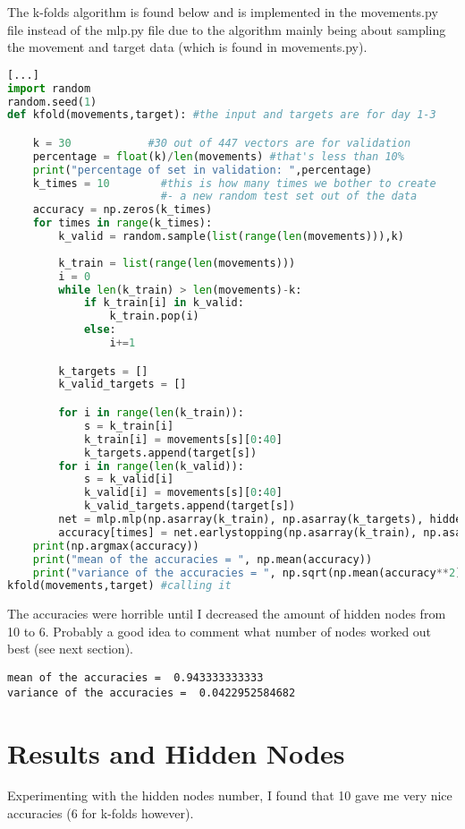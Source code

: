 \documentclass[10pt, a4paper]{article}
\begin{document}
The k-folds algorithm is found below and is implemented in the movements.py file instead of the mlp.py file due to the algorithm mainly being about sampling the movement and target data (which is found in movements.py).
\begin{lstlisting}[language = Python]
[...]
import random
random.seed(1)
def kfold(movements,target): #the input and targets are for day 1-3

    k = 30            #30 out of 447 vectors are for validation
    percentage = float(k)/len(movements) #that's less than 10%
    print("percentage of set in validation: ",percentage)
    k_times = 10        #this is how many times we bother to create
                        #- a new random test set out of the data
    accuracy = np.zeros(k_times)
    for times in range(k_times):
        k_valid = random.sample(list(range(len(movements))),k)
        
        k_train = list(range(len(movements)))
        i = 0
        while len(k_train) > len(movements)-k:
            if k_train[i] in k_valid:
                k_train.pop(i)
            else:
                i+=1

        k_targets = []
        k_valid_targets = []

        for i in range(len(k_train)):
            s = k_train[i]
            k_train[i] = movements[s][0:40]
            k_targets.append(target[s])
        for i in range(len(k_valid)):
            s = k_valid[i]
            k_valid[i] = movements[s][0:40]
            k_valid_targets.append(target[s])
        net = mlp.mlp(np.asarray(k_train), np.asarray(k_targets), hidden)
        accuracy[times] = net.earlystopping(np.asarray(k_train), np.asarray(k_targets), np.asarray(k_valid), np.asarray(k_valid_targets))
    print(np.argmax(accuracy))
    print("mean of the accuracies = ", np.mean(accuracy))
    print("variance of the accuracies = ", np.sqrt(np.mean(accuracy**2)-np.mean(accuracy)**2))
kfold(movements,target) #calling it
\end{lstlisting}
The accuracies were horrible until I decreased the amount of hidden nodes from 10 to 6. Probably a good idea to comment what number of nodes worked out best (see next section).
\begin{lstlisting}
mean of the accuracies =  0.943333333333
variance of the accuracies =  0.0422952584682
\end{lstlisting}


\section{Results and Hidden Nodes}
Experimenting with the hidden nodes number, I found that 10 gave me very nice accuracies (6 for k-folds however). 
\end{document}
